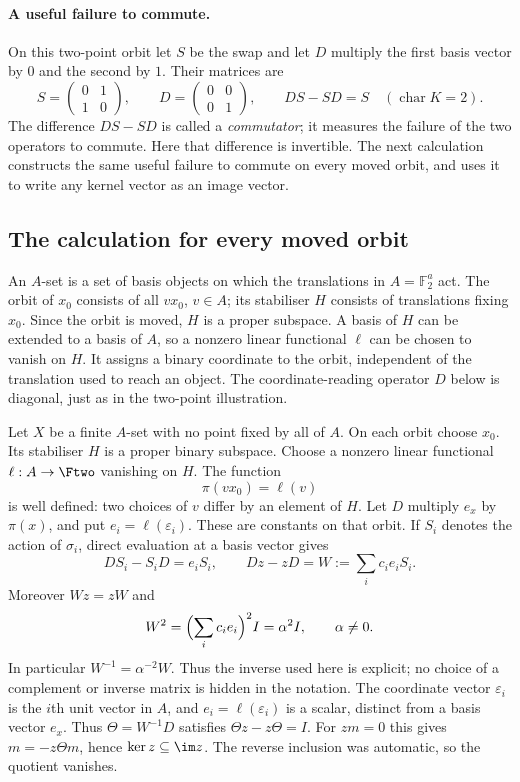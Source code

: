 \paragraph*{A useful failure to commute.}
On this two-point orbit let $S$ be the swap and let $D$ multiply
the first basis vector by $0$ and the second by $1$. Their matrices
are
\[
 S=\begin{pmatrix}0&1\\1&0\end{pmatrix},\qquad
 D=\begin{pmatrix}0&0\\0&1\end{pmatrix},\qquad DS-SD=S
 \quad(\operatorname{char}K=2).
\]
The difference $DS-SD$ is called a \emph{commutator}; it measures
the failure of the two operators to commute. Here that difference
is invertible. The next calculation constructs the same useful
failure to commute on every moved orbit, and uses it to write any
kernel vector as an image vector.

\subsection{The calculation for every moved orbit}
An $A$-set is a set of basis objects on which the translations in
$A=\mathbb F_2^a$ act. The orbit of $x_0$ consists of all $v x_0$,
$v\in A$; its stabiliser $H$ consists of translations fixing $x_0$.
Since the orbit is moved, $H$ is a proper subspace. A basis of $H$
can be extended to a basis of $A$, so a nonzero linear functional
$\ell$ can be chosen to vanish on $H$. It assigns a binary coordinate
to the orbit, independent of the translation used to reach an object.
The coordinate-reading operator $D$ below is diagonal, just as in
the two-point illustration.

Let $X$ be a finite $A$-set with no point fixed by all of $A$. On each orbit choose $x_0$. Its stabiliser $H$ is a proper binary subspace. Choose a nonzero linear functional $\ell:A\to\Ftwo$ vanishing on $H$. The function
\[\pi(vx_0)=\ell(v)\]
is well defined: two choices of $v$ differ by an element of $H$. Let $D$ multiply $e_x$ by $\pi(x)$, and put $e_i=\ell(\varepsilon_i)$. These are constants on that orbit. If $S_i$ denotes the action of $\sigma_i$, direct evaluation at a basis vector gives
\[DS_i-S_iD=e_iS_i,\qquad Dz-zD=W:=\sum_i c_ie_iS_i.\]
Moreover $Wz=zW$ and
\[W^2=\Bigl(\sum_i c_ie_i\Bigr)^2I=\alpha^2I,\qquad\alpha\ne0.\]
In particular $W^{-1}=\alpha^{-2}W$. Thus the inverse used here
is explicit; no choice of a complement or inverse matrix is hidden
in the notation. The coordinate vector $\varepsilon_i$ is the
$i$th unit vector in $A$, and $e_i=\ell(\varepsilon_i)$ is a
scalar, distinct from a basis vector $e_x$.
Thus $\Theta=W^{-1}D$ satisfies $\Theta z-z\Theta=I$. For $zm=0$ this gives $m=-z\Theta m$, hence $\ker z\subseteq\im z$. The reverse inclusion was automatic, so the quotient vanishes.

